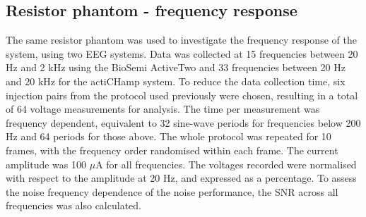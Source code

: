 \subsection{Resistor phantom - frequency response}
\label{MethodsRPFreq}
The same resistor phantom was used to investigate the frequency response of the system, using two EEG systems. Data was collected at 15 frequencies between 20 Hz and 2 kHz using the BioSemi ActiveTwo and 33 frequencies between 20 Hz and 20 kHz for the actiCHamp system. To reduce the data collection time, six injection pairs from the protocol used previously were chosen, resulting in a total of 64 voltage measurements for analysis. The time per measurement was frequency dependent, equivalent to 32 sine-wave periods for frequencies below 200 Hz and 64 periods for those above. The whole protocol was repeated for 10 frames, with the frequency order randomised within each frame. The current amplitude was 100 $\mu$A for all frequencies. The voltages recorded were normalised with respect to the amplitude at 20 Hz, and expressed as a percentage. To assess the noise frequency dependence of the noise performance, the SNR across all frequencies was also calculated.  


